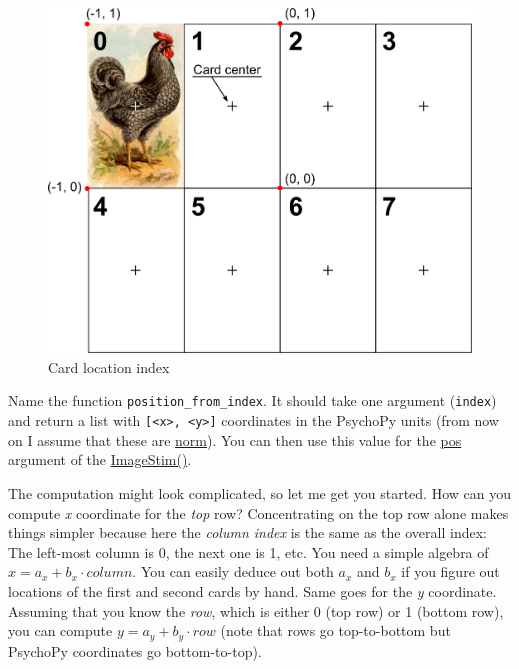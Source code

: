 \documentclass[
]{book}
\begin{document}
\begin{figure}
\centering
\includegraphics[width=1\textwidth,height=\textheight]{images/memory-location-index.png}
\caption{Card location index}
\end{figure}

Name the function \texttt{position\_from\_index}. It should take one argument (\texttt{index}) and return a list with \texttt{{[}\textless{}x\textgreater{},\ \textless{}y\textgreater{}{]}} coordinates in the PsychoPy units (from now on I assume that these are \protect\hyperlink{psychopy-units-norm}{norm}). You can then use this value for the \href{https://psychopy.org/api/visual/imagestim.html\#psychopy.visual.ImageStim.pos}{pos} argument of the \href{https://psychopy.org/api/visual/imagestim.html\#imagestim}{ImageStim()}.

The computation might look complicated, so let me get you started. How can you compute \emph{x} coordinate for the \emph{top} row? Concentrating on the top row alone makes things simpler because here the \emph{column index} is the same as the overall index: The left-most column is 0, the next one is 1, etc. You need a simple algebra of \(x = a_x + b_x \cdot column\). You can easily deduce out both \(a_x\) and \(b_x\) if you figure out locations of the first and second cards by hand. Same goes for the \emph{y} coordinate. Assuming that you know the \emph{row}, which is either 0 (top row) or 1 (bottom row), you can compute \(y = a_y + b_y \cdot row\) (note that rows go top-to-bottom but PsychoPy coordinates go bottom-to-top).
\end{document}

